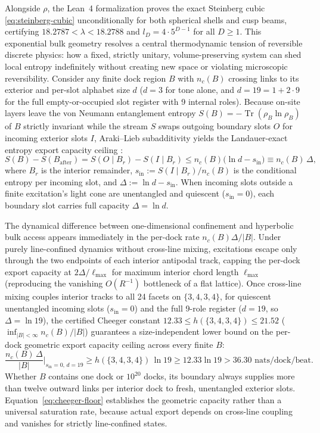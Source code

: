 Alongside $\rho$, the Lean~4 formalization proves the exact Steinberg cubic \eqref{eq:steinberg-cubic} unconditionally
for both spherical shells and cusp beams, certifying $18.2787 < \lambda < 18.2788$ and $l_D = 4 \cdot 5^{D-1}$ for all
$D \ge 1$. This exponential bulk geometry resolves a central thermodynamic tension of reversible discrete physics: how a
fixed, strictly unitary, volume-preserving system can shed local entropy indefinitely without creating new space or
violating microscopic reversibility. Consider any finite dock region $B$ with $n_c(B)$ crossing links to its exterior
and per-slot alphabet size $d$ ($d = 3$ for tone alone, and $d = 19 = 1 + 2 \cdot 9$ for the full empty-or-occupied
slot register with 9 internal roles). Because on-site layers leave the von Neumann entanglement entropy
$S(B) = -\operatorname{Tr}(\rho_B \ln \rho_B)$ of $B$ strictly invariant while the stream $S$ swaps outgoing boundary
slots $O$ for incoming exterior slots $I$, Araki--Lieb subadditivity \cite{araki1970} yields the Landauer-exact entropy
export capacity ceiling \cite{landauer1961}:
\begin{equation}
S(B) - S(B_{\mathrm{after}}) = S(O \mid B_r) - S(I \mid B_r) \le n_c(B)\bigl(\ln d - s_{\mathrm{in}}\bigr)
\equiv n_c(B)\, \Delta,
\label{eq:landauer-export}
\end{equation}
where $B_r$ is the interior remainder, $s_{\mathrm{in}} := S(I \mid B_r)/n_c(B)$ is the conditional entropy per
incoming slot, and $\Delta := \ln d - s_{\mathrm{in}}$. When incoming slots outside a finite excitation's light cone
are unentangled and quiescent ($s_{\mathrm{in}} = 0$), each boundary slot carries full capacity $\Delta = \ln d$.

The dynamical difference between one-dimensional confinement and hyperbolic bulk access appears immediately in the
per-dock rate $n_c(B)\Delta / |B|$. Under purely line-confined dynamics without cross-line mixing, excitations escape
only through the two endpoints of each interior antipodal track, capping the per-dock export capacity at
$2\Delta / \ell_{\max}$ for maximum interior chord length $\ell_{\max}$ (reproducing the vanishing $O(R^{-1})$
bottleneck of a flat lattice). Once cross-line mixing couples interior tracks to all 24 facets on $\{3,4,3,4\}$, for
quiescent unentangled incoming slots ($s_{\mathrm{in}} = 0$) and the full 9-role register ($d = 19$, so
$\Delta = \ln 19$), the certified Cheeger constant $12.33 \le h(\{3,4,3,4\}) \le 21.52$ ($\inf_{|B|<\infty} n_c(B)/|B|$)
guarantees a size-independent lower bound on the per-dock geometric export capacity ceiling across every finite $B$:
\begin{equation}
\frac{n_c(B)\, \Delta}{|B|}\Big|_{s_{\mathrm{in}}=0,\, d=19} \ge h(\{3,4,3,4\})\, \ln 19 \ge 12.33 \ln 19 > 36.30\text{ nats/dock/beat}.
\label{eq:cheeger-floor}
\end{equation}
Whether $B$ contains one dock or $10^{20}$ docks, its boundary always supplies more than twelve outward links per
interior dock to fresh, unentangled exterior slots. Equation~\eqref{eq:cheeger-floor} establishes the geometric capacity
rather than a universal saturation rate, because actual export depends on cross-line coupling and vanishes for strictly
line-confined states.

